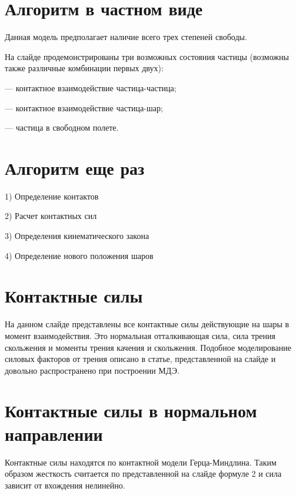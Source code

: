 \documentclass[a4paper]{article}
\begin{document}
\section{Алгоритм в частном виде}

Данная модель предполагает наличие всего трех степеней свободы.

На слайде продемонстрированы три возможных состояния частицы (возможны также различные комбинации первых двух):

--- контактное взаимодействие частица-частица;

--- контактное взаимодействие частица-шар;

--- частица в свободном полете.

\section{Алгоритм еще раз}

1) Определение контактов

2) Расчет контактных сил

3) Определения кинематического закона

4) Определение нового положения шаров


\section{Контактные силы}
На данном слайде представлены все контактные силы действующие на шары в момент взаимодействия.
Это нормальная отталкивающая сила, сила трения скольжения и моменты трения качения и скольжения.
Подобное моделирование силовых факторов от трения описано в статье, представленной на слайде и довольно распространено при построении МДЭ.

\section{Контактные силы в нормальном направлении}

Контактные силы находятся по контактной модели Герца-Миндлина.
Таким образом жесткость считается по представленной на слайде формуле 2 и сила зависит от вхождения нелинейно.
\end{document}
